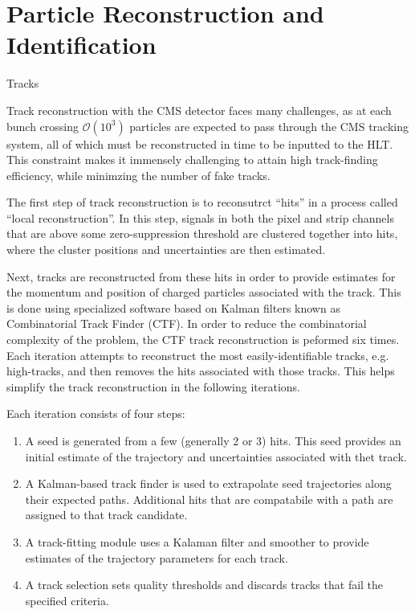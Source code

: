 \chapter{Particle Reconstruction and Identification}
\label{chap:reco_id}
\begin{section}{Tracks}

Track reconstruction with the CMS detector faces many challenges, as at each bunch crossing $\mathcal{O}(10^3)$ particles are expected to pass through the CMS tracking system, all of which must be reconstructed in time to be inputted to the HLT.
This constraint makes it immensely challenging to attain high track-finding efficiency, while minimzing the number of fake tracks.

The first step of track reconstruction is to reconsutrct ``hits'' in a process called ``local reconstruction''.
In this step, signals in both the pixel and strip channels that are above some zero-suppression threshold are clustered together into hits, where the cluster positions and uncertainties are then estimated.

Next, tracks are reconstructed from these hits in order to provide estimates for the momentum and position of charged particles associated with the track.
This is done using specialized software based on Kalman filters known as Combinatorial Track Finder (CTF).
In order to reduce the combinatorial complexity of the problem, the CTF track reconstruction is peformed six times. 
Each iteration attempts to reconstruct the most easily-identifiable tracks, e.g. high-\pT tracks, and then removes the hits associated with those tracks.
This helps simplify the track reconstruction in the following iterations.

Each iteration consists of four steps:
\begin{enumerate}
\item A seed is generated from a few (generally 2 or 3) hits. 
This seed provides an initial estimate of the trajectory and uncertainties associated with thet track.
\item A Kalman-based track finder is used to extrapolate seed trajectories along their expected paths. Additional hits that are compatabile with a path are assigned to that track candidate.
\item A track-fitting module uses a Kalaman filter and smoother to provide estimates of the trajectory parameters for each track.
\item A track selection sets quality thresholds and discards tracks that fail the specified criteria.
\end{enumerate}


\end{section}

